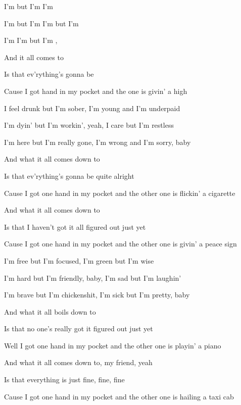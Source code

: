 

\zs
I'm  but I'm 
I'm  

I'm  but I'm  
I'm  but I'm 

I'm  
I'm  but I'm , 
\ks

\zr
And  it all comes  to 

Is that ev'rything's gonna be  

Cause I got  hand in my pocket
and the  one is givin' a high 
\kr

\zs
I feel drunk but I'm sober,
I'm young and I'm underpaid

I'm dyin' but I'm workin', yeah,
I care but I'm restless

I'm here but I'm really gone,
I'm wrong and I'm sorry, baby
\ks

\zr
And what it all comes down to

Is that ev'rything's gonna be quite alright

Cause I got one hand in my pocket
and the other one is flickin' a cigarette
\kr

\zr
And what it all comes down to

Is that I haven't got it all figured out just yet

Cause I got one hand in my pocket
and the other one is givin' a peace sign
\kr

\zs
I'm free but I'm focused,
I'm green but I'm wise

I'm hard but I'm friendly, baby,
I'm sad but I'm laughin'

I'm brave but I'm chickenshit,
I'm sick but I'm pretty, baby
\ks

\zr
And what it all boils down to

Is that no one's really got it figured out just yet

Well I got one hand in my pocket
and the other one is playin' a piano
\kr

\zr
And what it all comes down to, my friend, yeah

Is that everything is just fine, fine, fine

Cause I got one hand in my pocket
and the other one is hailing a taxi cab
\kr

\kp





